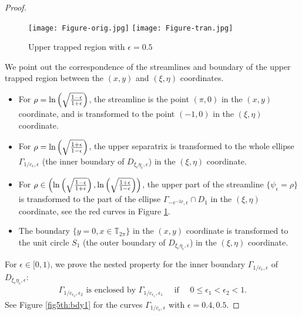 \documentclass[1 [leqno, 11pt]{amsart}
\numberwithin{equation}{section}
\let\ep=\epsilon
\begin{document}
\begin{CJK*}{GBK}{song}
\begin{proof}
\begin{figure}[ht]
    \centering
\texttt{[image: Figure-orig.jpg]}
\texttt{[image: Figure-tran.jpg]}
\caption{Upper trapped region with $\ep=0.5$}
	\label{Figure4th:orig-and-tran}
\end{figure}
We point out the correspondence of  the streamlines and boundary of the upper trapped region  between the $(x,y)$ and $(\xi,\eta)$ coordinates.
\begin{itemize}
 \item For $\rho=\ln\left(\sqrt{1-\ep\over 1+\ep}\right)$, the streamline is the point $(\pi,0)$ in the $(x,y)$  coordinate, and is transformed to the  point $(-1,0)$ in the $(\xi,\eta)$ coordinate.
    \item    For $\rho=\ln\left(\sqrt{1+\ep\over 1-\ep}\right)$,  the upper
separatrix is transformed to the whole ellipse $\Gamma_{1/c_\ep,\ep}$ (the inner boundary of $D_{\xi_\ep\eta_\ep,\ep}$) in the $(\xi,\eta)$ coordinate.
\item For $\rho\in\left(\ln\left(\sqrt{1-\ep\over 1+\ep}\right),\ln\left(\sqrt{1+\ep\over 1-\ep}\right)\right)$, the upper part of the  streamline $\{\psi_\ep=\rho\}$ is transformed to the part of the ellipse $\Gamma_{-e^{-2\rho},\ep}\cap D_1$  in the $(\xi,\eta)$ coordinate, see the red curves in Figure \ref{Figure4th:orig-and-tran}.
    \item The boundary $\{y=0,x\in\mathbb{T}_{2\pi}\}$ in the $(x,y)$  coordinate is transformed to the unit circle $S_1$ (the outer boundary of $D_{\xi_\ep\eta_\ep,\ep}$) in the $(\xi,\eta)$ coordinate.
 \end{itemize}
 \vspace{0.5mm}

 For $\ep\in[0,1)$, we prove the nested property for the inner boundary $\Gamma_{1/c_\ep,\ep}$ of $D_{\xi_{\ep}\eta_{\ep},\ep}$:
\begin{align}\label{Gamma12enclosed}
\Gamma_{1/c_{\ep_2},{\ep_2}}\text{  is  enclosed by }\Gamma_{1/c_{\ep_1},\ep_1} \quad\text{ if }\quad0\leq \ep_1< \ep_2<1.
\end{align}
See Figure \ref{fig5th:bdy1} for the curves  $\Gamma_{1/c_\ep,\ep}$ with $\ep=0.4, 0.5$.


\end{proof}
\end{CJK*}
\end{document}
